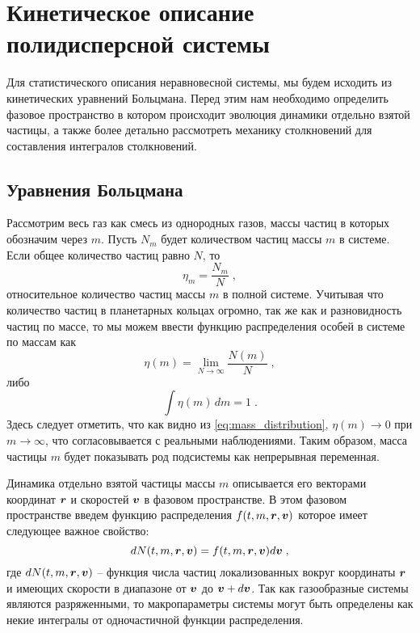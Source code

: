 \chapter{Кинетическое описание полидисперсной системы}
\label{cha:analysis}

Для статистического описания неравновесной системы, мы будем исходить из кинетических уравнений Больцмана.
Перед этим нам необходимо определить фазовое пространство в котором происходит эволюция динамики отдельно
взятой частицы, а также более детально рассмотреть механику столкновений для составления интегралов столкновений.

\section{Уравнения Больцмана}

Рассмотрим весь газ как смесь из однородных газов, массы частиц в которых обозначим через $m$. Пусть $N_m$ будет 
количеством частиц массы $m$ в системе. Если общее количество частиц равно $N$, то
\begin{equation}
  \eta_m = \frac{N_m}{N}\;,
\end{equation}
относительное количество частиц массы $m$ в полной системе. Учитывая что количество частиц в планетарных кольцах огромно,
так же как и разновидность частиц по массе, то мы можем ввести функцию распределения особей в системе по массам как
\begin{equation}
  \eta(m) = \lim_{N\to\infty}\frac{N(m)}{N}\;,
\end{equation}
либо
\begin{equation}\label{eq:mass_distribution}
  \int\eta(m)\,dm=1\;.
\end{equation}
Здесь следует отметить, что как видно из \ref{eq:mass_distribution}, $\eta(m)\to 0$ при $m\to\infty$, что согласовывается 
с реальными наблюдениями. Таким образом, масса частицы $m$ будет показывать род подсистемы как непрерывная переменная.

Динамика отдельно взятой частицы массы $m$ описывается его векторами координат $\bm{r}$ и скоростей $\bm{v}$ в фазовом пространстве.
В этом фазовом пространстве введем функцию распределения $f(t,m,\bm{r},\bm{v})$ которое имеет следующее важное свойство:
\begin{equation}
  dN(t, m,\bm{r},\bm{v}) = f(t, m, \bm{r}, \bm{v})d\bm{v}\;,
\end{equation}
где $dN(t, m, \bm{r}, \bm{v})$ -- функция числа частиц локализованных вокруг координаты $\bm{r}$ и имеющих скорости в диапазоне от
$\bm{v}$ до $\bm{v}+d\bm{v}$. 
Так как газообразные системы являются разряженными, то макропараметры системы могут быть определены как
некие интегралы от одночастичной функции распределения. 

